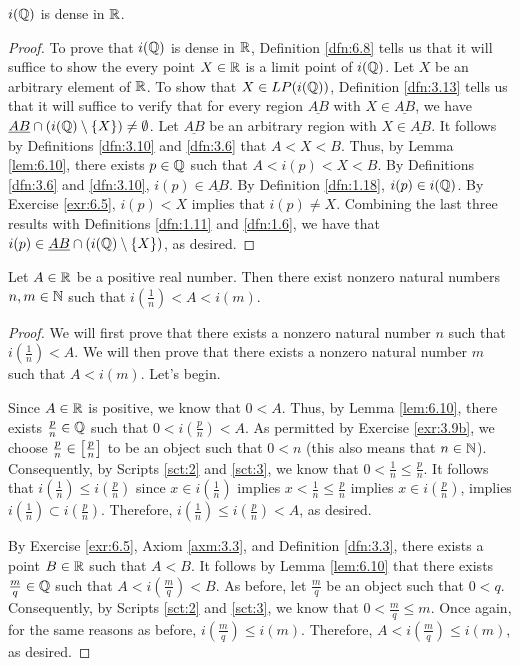 \documentclass[../main.tex]{subfiles}
\begin{document}
\begin{theorem}\label{trm:6.11}
    $i(\mathbb{Q})$ is dense in $\mathbb{R}$.
    \begin{proof}
        To prove that $i(\mathbb{Q})$ is dense in $\mathbb{R}$, Definition \ref{dfn:6.8} tells us that it will suffice to show the every point $X\in\mathbb{R}$ is a limit point of $i(\mathbb{Q})$. Let $X$ be an arbitrary element of $\mathbb{R}$. To show that $X\in LP(i(\mathbb{Q}))$, Definition \ref{dfn:3.13} tells us that it will suffice to verify that for every region $\underline{AB}$ with $X\in\underline{AB}$, we have $\underline{AB}\cap(i(\mathbb{Q})\setminus\{X\})\neq\emptyset$. Let $\underline{AB}$ be an arbitrary region with $X\in\underline{AB}$. It follows by Definitions \ref{dfn:3.10} and \ref{dfn:3.6} that $A<X<B$. Thus, by Lemma \ref{lem:6.10}, there exists $p\in\mathbb{Q}$ such that $A<i(p)<X<B$. By Definitions \ref{dfn:3.6} and \ref{dfn:3.10}, $i(p)\in\underline{AB}$. By Definition \ref{dfn:1.18}, $i(p)\in i(\mathbb{Q})$. By Exercise \ref{exr:6.5}, $i(p)<X$ implies that $i(p)\neq X$. Combining the last three results with Definitions \ref{dfn:1.11} and \ref{dfn:1.6}, we have that $i(p)\in\underline{AB}\cap(i(\mathbb{Q})\setminus\{X\})$, as desired.
    \end{proof}
\end{theorem}

\begin{corollary}\label{cly:6.12}
    Let $A\in\mathbb{R}$ be a positive real number. Then there exist nonzero natural numbers $n,m\in\mathbb{N}$ such that $i(\frac{1}{n})<A<i(m)$.
    \begin{proof}
        We will first prove that there exists a nonzero natural number $n$ such that $i(\frac{1}{n})<A$. We will then prove that there exists a nonzero natural number $m$ such that $A<i(m)$. Let's begin.\par
        Since $A\in\mathbb{R}$ is positive, we know that $0<A$. Thus, by Lemma \ref{lem:6.10}, there exists $\frac{p}{n}\in\mathbb{Q}$ such that $0<i(\frac{p}{n})<A$. As permitted by Exercise \ref{exr:3.9b}, we choose $\frac{p}{n}\in\left[ \frac{p}{n} \right]$ to be an object such that $0<n$ (this also means that $n\in\mathbb{N}$). Consequently, by Scripts \ref{sct:2} and \ref{sct:3}, we know that $0<\frac{1}{n}\leq\frac{p}{n}$. It follows that $i(\frac{1}{n})\leq i(\frac{p}{n})$ since $x\in i(\frac{1}{n})$ implies $x<\frac{1}{n}\leq\frac{p}{n}$ implies $x\in i(\frac{p}{n})$, implies $i(\frac{1}{n})\subset i(\frac{p}{n})$. Therefore, $i(\frac{1}{n})\leq i(\frac{p}{n})<A$, as desired.\par
        By Exercise \ref{exr:6.5}, Axiom \ref{axm:3.3}, and Definition \ref{dfn:3.3}, there exists a point $B\in\mathbb{R}$ such that $A<B$. It follows by Lemma \ref{lem:6.10} that there exists $\frac{m}{q}\in\mathbb{Q}$ such that $A<i(\frac{m}{q})<B$. As before, let $\frac{m}{q}$ be an object such that $0<q$. Consequently, by Scripts \ref{sct:2} and \ref{sct:3}, we know that $0<\frac{m}{q}\leq m$. Once again, for the same reasons as before, $i(\frac{m}{q})\leq i(m)$. Therefore, $A<i(\frac{m}{q})\leq i(m)$, as desired.
    \end{proof}
\end{corollary}
\end{document}
